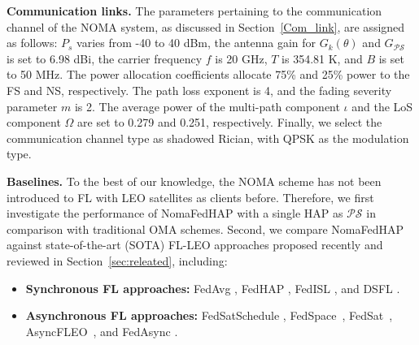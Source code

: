 \documentclass[letter,journal]{IEEEtran}
\newcommand{\sref}[1]{Section~\ref{#1}}
\begin{document}
\textbf{Communication links.} The parameters pertaining to the communication channel of the NOMA system, as discussed in \sref{Com_link}, are assigned as follows: $P_{s}$ varies from -40 to 40 dBm, %
the antenna gain for $G_k(\theta)$ and $G_{\mathcal {PS}}$ is set to 6.98 dBi, the carrier frequency $f$ is 20 GHz,  $T$ is 354.81 K, and $B$ is set to 50 MHz. The power allocation coefficients allocate 75\% and 25\% power to the FS and NS, respectively. The path loss exponent is 4, and the fading severity parameter $m$ is 2. The average power of the multi-path component $\iota$ and the LoS component $\Omega$ are set to 0.279 and 0.251, respectively. Finally, we select the communication channel type as shadowed Rician, with QPSK as the modulation type.




\textbf{Baselines.} To the best of our knowledge, the NOMA scheme has not been introduced to FL with LEO satellites as clients before. Therefore, we first investigate the performance of NomaFedHAP with a single HAP as $\mathcal {PS}$ in comparison with traditional OMA schemes. Second, we compare NomaFedHAP against state-of-the-art (SOTA) FL-LEO approaches proposed recently and reviewed in \sref{sec:releated}, including: 
\begin{itemize}
    \item {\bf Synchronous FL approaches:} FedAvg \cite{mcmahan2017communication}, FedHAP \cite{happaper}, FedISL \cite{razmi}, and DSFL \cite{wu2022dsfl}.
    \item {\bf Asynchronous FL approaches:} FedSatSchedule \cite{razmi2022scheduling}, FedSpace~\cite{so2022fedspace},  FedSat~\cite{razmi2022ground},  AsyncFLEO~\cite{mAsyFLEO}, and FedAsync \cite{xie2020asynchronous}.
\end{itemize}
\end{document}
